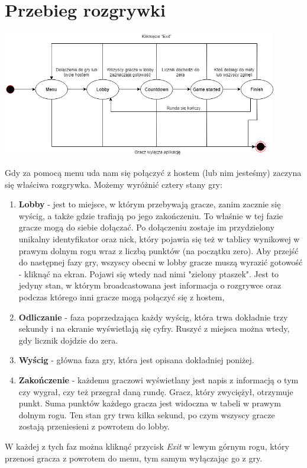 \documentclass[]{report}
\begin{document}
\chapter*{Przebieg rozgrywki}
\begin{center}
	\includegraphics[width=0.9\textwidth]{game_cycle.png}
\end{center}
\bigskip
\quad Gdy za pomocą menu uda nam się połączyć z hostem (lub nim jesteśmy) zaczyna się właściwa rozgrywka. Możemy wyróżnić cztery stany gry:
\begin{enumerate}
	\item \textbf{Lobby} - jest to miejsce, w którym przebywają gracze, zanim zacznie się wyścig, a także gdzie trafiają po jego zakończeniu. To właśnie w tej fazie gracze mogą do siebie dołączać. Po dołączeniu zostaje im przydzielony unikalny identyfikator oraz nick, który pojawia się też w tablicy wynikowej w prawym dolnym rogu wraz z liczbą punktów (na początku zero). Aby przejść do następnej fazy gry, wszyscy obecni w lobby gracze muszą wyrazić gotowość - kliknąć na ekran. Pojawi się wtedy nad nimi "zielony ptaszek". Jest to jedyny stan, w którym broadcastowana jest informacja o rozgrywce oraz podczas którego inni gracze mogą połączyć się z hostem,
	\item \textbf{Odliczanie} - faza poprzedzająca każdy wyścig, która trwa dokładnie trzy sekundy i na ekranie wyświetlają się cyfry. Ruszyć z miejsca można wtedy, gdy licznik dojdzie do zera.
	\item \textbf{Wyścig} - główna faza gry, która jest opisana dokładniej poniżej.
	\item \textbf{Zakończenie} - każdemu graczowi wyświetlany jest napis z informacją o tym czy wygrał, czy też przegrał daną rundę. Gracz, który zwyciężył, otrzymuje punkt. Suma punktów każdego gracza jest widoczna w tabeli w prawym dolnym rogu. Ten stan gry trwa kilka sekund, po czym wszyscy gracze zostają przeniesieni z powrotem do lobby.
\end{enumerate}
W każdej z tych faz można kliknąć przycisk \textit{Exit} w lewym górnym rogu, który przenosi gracza z powrotem do menu, tym samym wyłączając go z gry. \\\\
\end{document}
